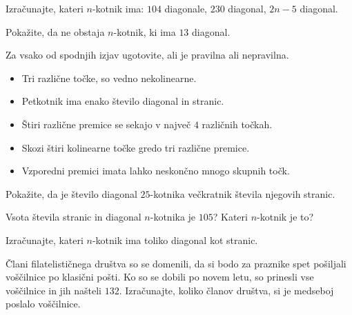             \begin{naloga}
                Izračunajte, kateri $n$-kotnik ima: $104$ diagonale, $230$ diagonal, $2n-5$ diagonal.
            \end{naloga}

            \begin{naloga}
                Pokažite, da ne obstaja $n$-kotnik, ki ima $13$ diagonal.  
            \end{naloga}
            

            \begin{naloga}
                Za vsako od spodnjih izjav ugotovite, ali je pravilna ali nepravilna.
                \begin{itemize}
                    \item Tri različne točke, so vedno nekolinearne.
                    \item Petkotnik ima enako število diagonal in stranic.
                    \item Štiri različne premice se sekajo v največ $4$ različnih točkah.
                    \item Skozi štiri kolinearne točke gredo tri različne premice.
                    \item Vzporedni premici imata lahko neskončno mnogo skupnih točk.
                \end{itemize}
            \end{naloga}

            \begin{naloga}
                Pokažite, da je število diagonal $25$-kotnika večkratnik števila njegovih stranic.
            \end{naloga}

            \begin{naloga}
                Vsota števila stranic in diagonal $n$-kotnika je $105$? Kateri $n$-kotnik je to?
            \end{naloga}
        

            \begin{naloga}
                Izračunajte, kateri $n$-kotnik ima toliko diagonal kot stranic.
            \end{naloga}

            \begin{naloga}
                Člani filatelističnega društva so se domenili, da si bodo za praznike spet pošiljali voščilnice po klasični pošti.
                Ko so se dobili po novem letu, so prinesli vse voščilnice in jih našteli $132$.
                Izračunajte, koliko članov društva, si je medseboj poslalo voščilnice.                
            \end{naloga}


